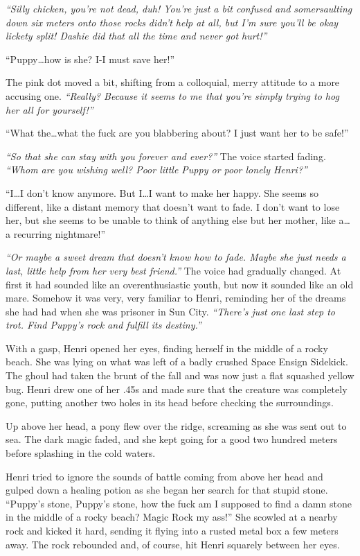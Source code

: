 \emph{``Silly chicken, you're not dead, \emph{duh}! You're just a bit confused and somersaulting down six meters onto those rocks didn't help at all, but I'm sure you'll be okay lickety split! Dashie did that all the time and never got hurt!''}

``Puppy\dots how is she? I-I must save her!''

The pink dot moved a bit, shifting from a colloquial, merry attitude to a more accusing one. \emph{``Really? Because it seems to me that you're simply trying to hog her all for yourself!''}

``What the\dots what the fuck are you blabbering about? I just want her to be safe!''

\emph{``So that she can stay with you forever and ever?''} The voice started fading. \emph{``Whom are you wishing well? Poor little Puppy or poor lonely Henri?''}

``I\dots I don't know anymore. But I\dots I want to make her happy. She seems so different, like a distant memory that doesn't want to fade. I don't want to lose her, but she seems to be unable to think of anything else but her mother, like a\dots a recurring nightmare!''

\emph{``Or maybe a sweet dream that doesn't know how to fade. Maybe she just needs a last, little help from her very best friend.''} The voice had gradually changed. At first it had sounded like an overenthusiastic youth, but now it sounded like an old mare. Somehow it was very, very familiar to Henri, reminding her of the dreams she had had when she was prisoner in Sun City. \emph{``There's just one last step to trot. Find Puppy's rock and fulfill its destiny.''}

With a gasp, Henri opened her eyes, finding herself in the middle of a rocky beach. She was lying on what was left of a badly crushed Space Ensign Sidekick. The ghoul had taken the brunt of the fall and was now just a flat squashed yellow bug. Henri drew one of her .45s and made sure that the creature was completely gone, putting another two holes in its head before checking the surroundings.

Up above her head, a pony flew over the ridge, screaming as she was sent out to sea. The dark magic faded, and she kept going for a good two hundred meters before splashing in the cold waters.

Henri tried to ignore the sounds of battle coming from above her head and gulped down a healing potion as she began her search for that stupid stone. ``Puppy's stone, Puppy's stone, how the fuck am I supposed to find a damn stone in the middle of a rocky beach? Magic Rock my ass!'' She scowled at a nearby rock and kicked it hard, sending it flying into a rusted metal box a few meters away. The rock rebounded and, of course, hit Henri squarely between her eyes.

